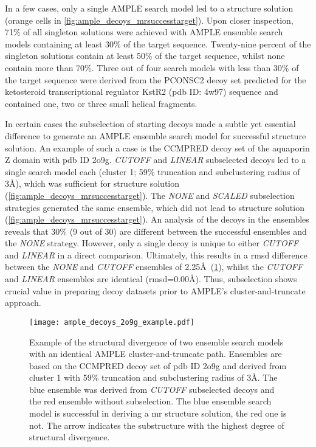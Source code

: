 In a few cases, only a single AMPLE search model led to a structure solution (orange cells in \cref{fig:ample_decoys_mrsuccesstarget}). Upon closer inspection, 71\% of all singleton solutions were achieved with AMPLE ensemble search models containing at least 30\% of the target sequence. Twenty-nine percent of the singleton solutions contain at least 50\% of the target sequence, whilst none contain more than 70\%. Three out of four search models with less than 30\% of the target sequence were derived from the PCONSC2 decoy set predicted for the ketosteroid transcriptional regulator KstR2 (\gls{pdb} ID: 4w97) sequence and contained one, two or three small helical fragments.  

In certain cases the subselection of starting decoys made a subtle yet essential difference to generate an AMPLE ensemble search model for successful structure solution. An example of such a case is the CCMPRED decoy set of the aquaporin Z domain with \gls{pdb} ID 2o9g. \textit{CUTOFF} and \textit{LINEAR} subselected decoys led to a single search model each (cluster 1; 59\% truncation and subclustering radius of 3\AA), which was sufficient for structure solution (\cref{fig:ample_decoys_mrsuccesstarget}). The \textit{NONE} and \textit{SCALED} subselection strategies generated the same ensemble, which did not lead to structure solution (\cref{fig:ample_decoys_mrsuccesstarget}). An analysis of the decoys in the ensembles reveals that 30\% (9 out of 30) are different between the successful ensembles and the \textit{NONE} strategy. However, only a single decoy is unique to either \textit{CUTOFF} and \textit{LINEAR} in a direct comparison. Ultimately, this results in a \gls{rmsd} difference between the \textit{NONE} and \textit{CUTOFF} ensembles of 2.25\AA\ (\cref{fig:ample_decoys_2o9g_example}), whilst the \textit{CUTOFF} and \textit{LINEAR} ensembles are identical (\gls{rmsd}=0.00\AA). Thus, subselection shows crucial value in preparing decoy datasets prior to AMPLE's cluster-and-truncate approach.

\begin{figure}[H]
    \centering
    \texttt{[image: ample\_decoys\_2o9g\_example.pdf]}
    \caption[Comparison of ensembles derived from differently subselected decoys]{Example of the structural divergence of two ensemble search models with an identical AMPLE cluster-and-truncate path. Ensembles are based on the CCMPRED decoy set of \gls{pdb} ID 2o9g and derived from cluster 1 with 59\% truncation and subclustering radius of 3\AA. The blue ensemble was derived from \textit{CUTOFF} subselected decoys and the red ensemble without subselection. The blue ensemble search model is successful in deriving a \gls{mr} structure solution, the red one is not. The arrow indicates the substructure with the highest degree of structural divergence.}
    \label{fig:ample_decoys_2o9g_example}
\end{figure}

